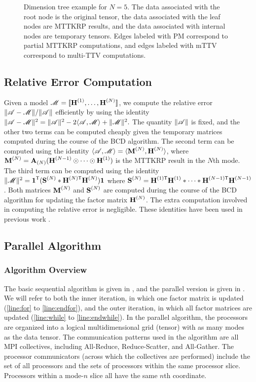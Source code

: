 \begin{figure}

\caption{Dimension tree example for $N=5$. 
The data associated with the root node is the original tensor, the data associated with the leaf nodes are MTTKRP results, and the data associated with internal nodes are temporary tensors.  
Edges labeled with PM correspond to partial MTTKRP computations, and edges labeled with mTTV correspond to multi-TTV computations.}
\label{fig:DT}
\end{figure}

\subsection{Relative Error Computation}
\label{sec:error}

Given a model $\T{M}=\CP$, we compute the relative error $\|\TA - \T{M}\|/\|\TA\|$ efficiently by using the identity $\|\TA-\T{M}\|^2 = \|\TA\|^2 - 2\langle \TA, \T{M} \rangle + \|\T{M}\|^2.$
The quantity $\|\TA\|$ is fixed, and the other two terms can be computed cheaply given the temporary matrices computed during the course of the BCD algorithm.
The second term can be computed using the identity $\langle \TA, \T{M} \rangle = \langle \Mn{M}{N}, \Mn{H}{N} \rangle$, where $\Mn{M}{N} = \Mz{A}{N} (\Mn{H}{N-1} \Khat \cdots \Khat \Mn{H}{1})$ is the MTTKRP result in the $N$th mode.
The third term can be computed using the identity $\|\T{M}\|^2 = \V{1}^\Tra(\Mn{S}{N} \Hada \MnTra{H}{N} \Mn{H}{N})\V{1}$ where $\Mn{S}{N}=\MnTra{H}{1} \Mn{H}{1} \Hada \cdots \Hada \MnTra{H}{N-1} \Mn{H}{N-1}$.
Both matrices $\Mn{M}{N}$ and $\Mn{S}{N}$ are computed during the course of the BCD algorithm for updating the factor matrix $\Mn{H}{N}$.
The extra computation involved in computing the relative error is negligible.
These identities have been used in previous work \cite{KB09,TensorBox,SK16,LKLHS2017}.

\subsection{Parallel Algorithm}

\subsubsection{Algorithm Overview}

The basic sequential algorithm is given in , and the parallel version is given in .
We will refer to both the inner iteration, in which one factor matrix is updated (\cref{line:for} to \cref{line:endfor}), and the outer iteration, in which all factor matrices are updated (\cref{line:while} to \cref{line:endwhile}).
In the parallel algorithm, the processors are organized into a logical multidimensional grid (tensor) with as many modes as the data tensor.
The communication patterns used in the algorithm are all MPI collectives, including All-Reduce, Reduce-Scatter, and All-Gather.
The processor communicators (across which the collectives are performed) include the set of all processors and the sets of processors within the same processor slice.
Processors within a mode-$n$ slice all have the same $n$th coordinate.

